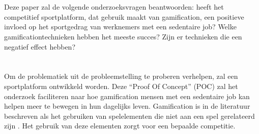 
\section{}%
\label{sec:onderzoeksvraag}


Deze paper zal de volgende onderzoeksvragen beantwoorden: heeft het competitief
sportplatform, dat gebruik maakt van gamification, een positieve invloed
op het sportgedrag van werknemers met een sedentaire job? Welke gamificationtechnieken
hebben het meeste succes? Zijn er technieken die een negatief effect
hebben?

\section{}%
\label{sec:onderzoeksdoelstelling}

Om de problematiek uit de probleemstelling te proberen verhelpen, zal een \linebreak sportplatform ontwikkeld worden. Deze ``Proof Of Concept'' (POC) zal het onderzoek faciliteren naar hoe gamification mensen met een sedentaire job kan helpen meer te bewegen in hun dagelijks leven. Gamification is in de literatuur beschreven als het gebruiken van spelelementen die niet aan een spel gerelateerd zijn \autocite{Gaalen2020}. Het gebruik van deze elementen zorgt voor een bepaalde competitie.

